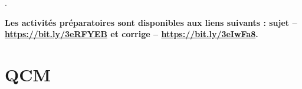 \documentclass[t,10pt]{article}
\begin{document}
\enteteinfo

\setlength{\columnseprule}{0.4pt}.

\textbf{Les activités préparatoires sont disponibles aux liens suivants : sujet -- \url{https://bit.ly/3eRFYEB} et corrige -- \url{https://bit.ly/3eIwFa8}.}

\section*{QCM}

\begin{multicols}{2}

\end{multicols}
\end{document}
